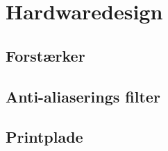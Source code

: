 \section{Hardwaredesign}
\subsection{Forstærker}
\subsection{Anti-aliaserings filter}
\subsection{Printplade}
\vspace{1 cm}